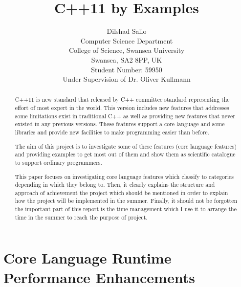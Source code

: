 \documentclass[11pt]{report}
\begin{document}
\author{Dilshad Sallo\\[1ex]
  Computer Science Department\\
  College of Science, Swansea University\\
  Swansea, SA2 8PP, UK\\[1ex]
  Student Number: 59950\\
  Under Supervision of Dr. Oliver Kullmann
}

\title{C++11 by Examples}

\maketitle



\begin{abstract}

C++11 is new standard that released by C++ committee standard representing the effort of most expert in the world. This version includes new features that addresses some limitations exist in traditional C++ as well as providing new features that never existed in any previous versions. These features support a core language and some libraries and  provide new facilities  to make programming easier than before.

The aim of this project is to investigate some of these features (core \linebreak language features) and providing examples to get most out of them and show them as scientific catalogue to support  ordinary programmers.

This paper focuses on investigating core language features which classify to categories depending in which they belong to. Then, it clearly explains the structure  and  approach of achievement the project which should be mentioned in order to explain how the project will be implemented in the  summer. Finally, it should not be forgotten the important part of this report is the time management which  I use it to arrange the time in the summer to reach the purpose of project.
\end{abstract}

\tableofcontents

\chapter{Core Language Runtime Performance Enhancements}
\label{chapter: Runtime Performance Enhancements}
\end{document}
